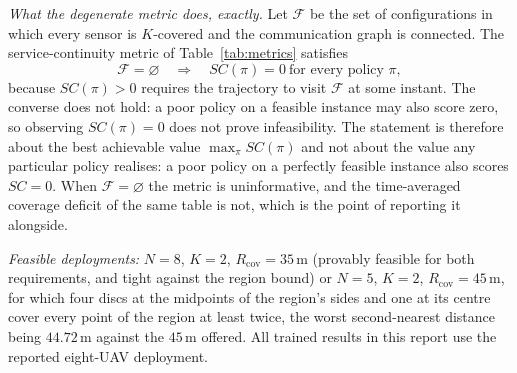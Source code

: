\documentclass[conference]{IEEEtran}
\newcommand{\tokAltNfiveR}{44.72}
\begin{document}
\emph{What the degenerate metric does, exactly.} Let $\mathcal{F}$ be the
set of configurations in which every sensor is $K$-covered and the
communication graph is connected.  The service-continuity metric of
Table~\ref{tab:metrics} satisfies
\begin{equation}
\mathcal{F}=\varnothing \quad\Longrightarrow\quad SC(\pi)=0\ \text{for every policy }\pi,
\label{eq:scdegenerate}
\end{equation}
because $SC(\pi)>0$ requires the trajectory to visit $\mathcal{F}$ at some
instant.  The converse does not hold: a poor policy on a feasible instance
may also score zero, so observing $SC(\pi)=0$ does not prove infeasibility.
The statement is therefore about the best achievable value
$\max_\pi SC(\pi)$ and not about the value any particular policy realises:
a poor policy on a perfectly feasible instance also scores $SC=0$.  When
$\mathcal{F}=\varnothing$ the metric is uninformative, and the
time-averaged coverage deficit of the same table is not, which is the
point of reporting it alongside.

\emph{Feasible deployments:} $N=8$, $K=2$, $R_{\mathrm{cov}}=35$\,m
(provably feasible for both requirements, and tight against the region
bound) or $N=5$, $K=2$, $R_{\mathrm{cov}}=45$\,m, for which four discs at
the midpoints of the region's sides and one at its centre cover every point
of the region at least twice, the worst second-nearest distance being
$\tokAltNfiveR$\,m against the $45$\,m offered. All trained results in this
report use the reported eight-UAV deployment.
\end{document}
